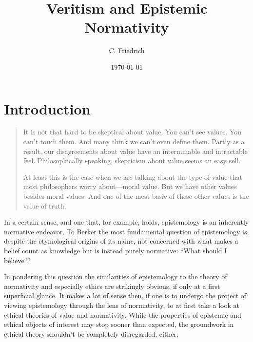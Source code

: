 \documentclass[12pt,numbers=noenddot]{scrartcl}
\title { Veritism and Epistemic Normativity }
\author{C. Friedrich}
\date{\today}
\begin{document}
\begin{titlepage}
\maketitle


\thispagestyle{empty}
\end{titlepage}

\tableofcontents
\newpage

\section{Introduction}

\begin{quote}
    It is not that hard to be skeptical about value. You can't see values. You can't touch them. And many think we can't even define them. Partly as a result, our disagreements about value have an interminable and intractable feel. Philosophically speaking, skepticism about value seems an easy sell.

    At least this is the case when we are talking about the type of value that most philosophers worry about—moral value. But we have other values besides moral values. And one of the most basic of these other values is the value of truth. \autocite[225]{Lynch2009}
\end{quote}


In a certain sense, and one that, for example, \textcite{Berker2013-BERETA-2} holds, epistemology is an inherently normative endeavor. To Berker the most fundamental question of epistemology is, despite the etymological origins of its name, not concerned with what makes a belief count as knowledge but is instead purely normative: “What should I believe“?

In pondering this question the similarities of epistemology to the theory of normativity and especially ethics are strikingly obvious, if only at a first superficial glance. It makes a lot of sense then, if one is to undergo the project of viewing epistemology through the lens of normativity, to at first take a look at ethical theories of value and normativity. While the properties of epistemic and ethical objects of interest may stop sooner than expected, the groundwork in ethical theory shouldn't be completely disregarded, either.
\end{document}
